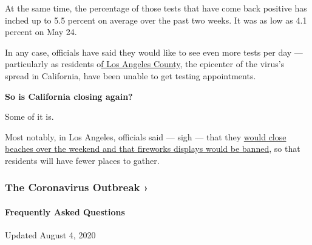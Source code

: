 At the same time, the percentage of those tests that have come back
positive has inched up to 5.5 percent on average over the past two
weeks. It was as low as 4.1 percent on May 24.

In any case, officials have said they would like to see even more tests
per day --- particularly as residents
o\href{https://www.latimes.com/california/story/2020-06-24/why-is-it-still-so-hard-to-get-a-coronavirus-test}{f
Los Angeles County}, the epicenter of the virus's spread in California,
have been unable to get testing appointments.

\textbf{So is California closing again?}

Some of it is.

Most notably, in Los Angeles, officials said --- sigh --- that they
\href{https://twitter.com/lapublichealth/status/1277758362097037313}{would
close beaches over the weekend and that fireworks displays would be
banned}, so that residents will have fewer places to gather.

\href{https://www.nytimes.com/news-event/coronavirus?action=click\&pgtype=Article\&state=default\&region=MAIN_CONTENT_3\&context=storylines_faq}{}

\hypertarget{the-coronavirus-outbreak-}{%
\subsubsection{The Coronavirus Outbreak
›}\label{the-coronavirus-outbreak-}}

\hypertarget{frequently-asked-questions}{%
\paragraph{Frequently Asked
Questions}\label{frequently-asked-questions}}

Updated August 4, 2020

